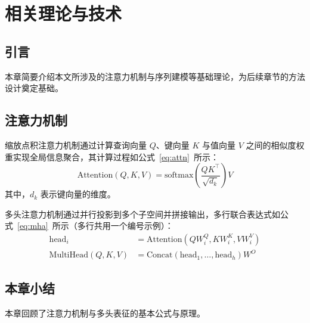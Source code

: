 \chapter{相关理论与技术}
\label{chap:theory}

\section{引言}
本章简要介绍本文所涉及的注意力机制与序列建模等基础理论，为后续章节的方法设计奠定基础。

\section{注意力机制}
缩放点积注意力机制\cite{vaswani2017attention}通过计算查询向量 $Q$、键向量 $K$ 与值向量 $V$ 之间的相似度权重实现全局信息聚合，其计算过程如公式~\eqref{eq:attn}~所示：
\begin{equation}
  \mathrm{Attention}(Q, K, V) = \mathrm{softmax}\left(\frac{QK^{\top}}{\sqrt{d_k}}\right)V
  \label{eq:attn}
\end{equation}
其中，$d_k$ 表示键向量的维度。

多头注意力机制通过并行投影到多个子空间并拼接输出，多行联合表达式如公式~\eqref{eq:mha}~所示（多行共用一个编号示例）：
\begin{equation}
  \begin{aligned}
    \mathrm{head}_i &= \mathrm{Attention}(QW_i^Q, KW_i^K, VW_i^V) \\
    \mathrm{MultiHead}(Q, K, V) &= \mathrm{Concat}(\mathrm{head}_1, \dots, \mathrm{head}_h) W^O
  \end{aligned}
  \label{eq:mha}
\end{equation}

\section{本章小结}
本章回顾了注意力机制与多头表征的基本公式与原理。
